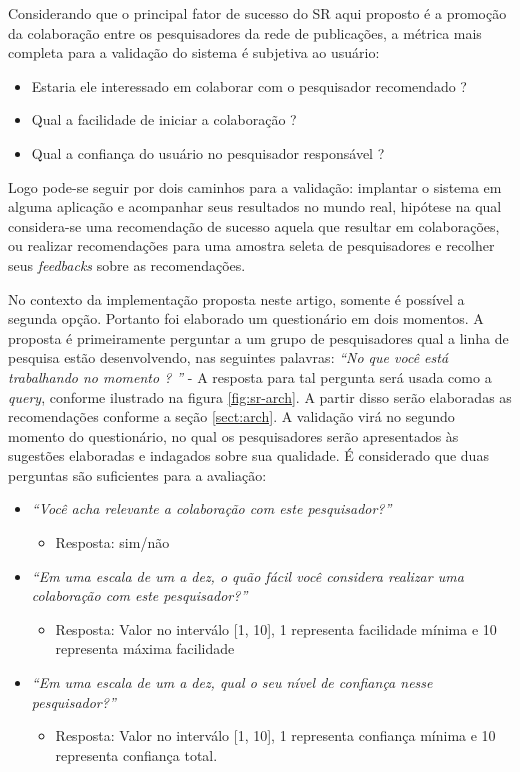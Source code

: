 \documentclass[12pt]{article}
\begin{document}
Considerando que o principal fator de sucesso do SR aqui proposto é a promoção da colaboração entre os pesquisadores da rede de 
publicações, a métrica mais completa para a validação do sistema é subjetiva ao usuário: 

\begin{itemize}
  \item Estaria ele interessado em colaborar com o pesquisador recomendado ?
  \item Qual a facilidade de iniciar a colaboração ?
  \item Qual a confiança do usuário no pesquisador responsável ?  
\end{itemize}

Logo pode-se seguir por dois caminhos para a validação: implantar o sistema em alguma aplicação e acompanhar seus resultados no 
mundo real, hipótese na qual considera-se uma recomendação de sucesso aquela que resultar em colaborações, ou realizar 
recomendações para uma amostra seleta de pesquisadores e recolher seus \textit{feedbacks} sobre as recomendações.

No contexto da implementação proposta neste artigo, somente é possível a segunda opção. Portanto foi elaborado um questionário 
em dois momentos. A proposta é primeiramente perguntar a um grupo de pesquisadores qual a linha de pesquisa estão desenvolvendo, 
nas seguintes palavras: \textit{“No que você está trabalhando no momento ? ”} - A resposta para tal pergunta será usada como a 
\textit{query}, conforme ilustrado na figura \ref{fig:sr-arch}. A partir disso serão elaboradas as recomendações conforme a seção 
\ref{sect:arch}. A validação virá no segundo momento do questionário, no qual os pesquisadores serão apresentados às sugestões 
elaboradas e indagados sobre sua qualidade. É considerado que duas perguntas são suficientes para a avaliação:

\begin{itemize}
  \item \textit{“Você acha relevante a colaboração com este pesquisador?”}
  \begin{itemize}
    \item Resposta: sim/não
  \end{itemize}
  \item \textit{“Em uma escala de um a dez, o quão fácil você considera realizar uma colaboração com este pesquisador?”}
  \begin{itemize}
    \item Resposta: Valor no interválo [1, 10], 1 representa facilidade mínima e 10 representa máxima facilidade
  \end{itemize}
  \item \textit{“Em uma escala de um a dez, qual o seu nível de confiança nesse pesquisador?”}
  \begin{itemize}
    \item Resposta: Valor no interválo [1, 10], 1 representa confiança mínima e 10 representa confiança total.  
  \end{itemize}
\end{itemize}
\end{document}
